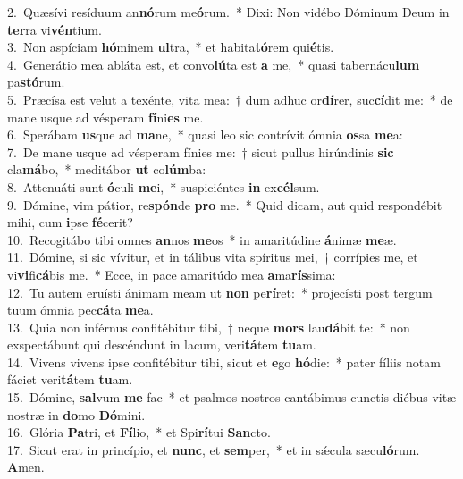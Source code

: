 {2.~}Quæsívi resíduum an\textbf{nó}rum me\textbf{ó}rum.~* Dixi: Non vidébo Dóminum Deum in \textbf{ter}ra vi\textbf{vén}tium.\\
{3.~}Non aspíciam \textbf{hó}minem \textbf{ul}tra,~* et habita\textbf{tó}rem qui\textbf{é}tis.\\
{4.~}Generátio mea abláta est, et convo\textbf{lú}ta est \textbf{a} me,~* quasi tabernácu\textbf{lum} pa\textbf{stó}rum.\\
{5.~}Præcísa est velut a texénte, vita mea:~† dum adhuc or\textbf{dí}rer, suc\textbf{cí}dit me:~* de mane usque ad vésperam \textbf{fí}ni\textbf{es} me.\\
{6.~}Sperábam \textbf{us}que ad \textbf{ma}ne,~* quasi leo sic contrívit ómnia \textbf{os}sa \textbf{me}a:\\
{7.~}De mane usque ad vésperam fínies me:~† sicut pullus hirúndinis \textbf{sic} cla\textbf{má}bo,~* meditábor \textbf{ut} co\textbf{lúm}ba:\\
{8.~}Attenuáti sunt \textbf{ó}culi \textbf{me}i,~* suspiciéntes \textbf{in} ex\textbf{cél}sum.\\
{9.~}Dómine, vim pátior, re\textbf{spón}de \textbf{pro} me.~* Quid dicam, aut quid respondébit mihi, cum \textbf{i}pse \textbf{fé}cerit?\\
{10.~}Recogitábo tibi omnes \textbf{an}nos \textbf{me}os~* in amaritúdine \textbf{á}nimæ \textbf{me}æ.\\
{11.~}Dómine, si sic vívitur, et in tálibus vita spíritus mei,~† corrípies me, et vi\textbf{vi}fi\textbf{cá}bis me.~* Ecce, in pace amaritúdo mea \textbf{a}ma\textbf{rís}sima:\\
{12.~}Tu autem eruísti ánimam meam ut \textbf{non} pe\textbf{rí}ret:~* projecísti post tergum tuum ómnia pec\textbf{cá}ta \textbf{me}a.\\
{13.~}Quia non inférnus confitébitur tibi,~† neque \textbf{mors} lau\textbf{dá}bit te:~* non exspectábunt qui descéndunt in lacum, veri\textbf{tá}tem \textbf{tu}am.\\
{14.~}Vivens vivens ipse confitébitur tibi, sicut et \textbf{e}go \textbf{hó}die:~* pater fíliis notam fáciet veri\textbf{tá}tem \textbf{tu}am.\\
{15.~}Dómine, \textbf{sal}vum \textbf{me} fac~* et psalmos nostros cantábimus cunctis diébus vitæ nostræ in \textbf{do}mo \textbf{Dó}mini.\\
{16.~}Glória \textbf{Pa}tri, et \textbf{Fí}lio,~* et Spi\textbf{rí}tui \textbf{San}cto.\\
{17.~}Sicut erat in princípio, et \textbf{nunc}, et \textbf{sem}per,~* et in sǽcula sæcu\textbf{ló}rum. \textbf{A}men.\\
